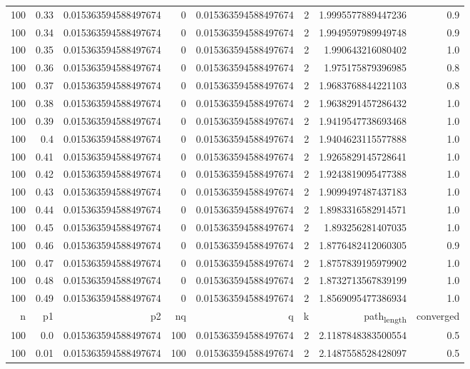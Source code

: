 \documentclass[11pt]{article}
\begin{document}
\begin{center}
\begin{tabular}{rrrrrrrr}
100 & 0.33 & 0.015363594588497674 & 0 & 0.015363594588497674 & 2 & 1.9995577889447236 & 0.9\\
100 & 0.34 & 0.015363594588497674 & 0 & 0.015363594588497674 & 2 & 1.9949597989949748 & 0.9\\
100 & 0.35 & 0.015363594588497674 & 0 & 0.015363594588497674 & 2 & 1.990643216080402 & 1.0\\
100 & 0.36 & 0.015363594588497674 & 0 & 0.015363594588497674 & 2 & 1.975175879396985 & 0.8\\
100 & 0.37 & 0.015363594588497674 & 0 & 0.015363594588497674 & 2 & 1.9683768844221103 & 0.8\\
100 & 0.38 & 0.015363594588497674 & 0 & 0.015363594588497674 & 2 & 1.9638291457286432 & 1.0\\
100 & 0.39 & 0.015363594588497674 & 0 & 0.015363594588497674 & 2 & 1.9419547738693468 & 1.0\\
100 & 0.4 & 0.015363594588497674 & 0 & 0.015363594588497674 & 2 & 1.9404623115577888 & 1.0\\
100 & 0.41 & 0.015363594588497674 & 0 & 0.015363594588497674 & 2 & 1.9265829145728641 & 1.0\\
100 & 0.42 & 0.015363594588497674 & 0 & 0.015363594588497674 & 2 & 1.9243819095477388 & 1.0\\
100 & 0.43 & 0.015363594588497674 & 0 & 0.015363594588497674 & 2 & 1.9099497487437183 & 1.0\\
100 & 0.44 & 0.015363594588497674 & 0 & 0.015363594588497674 & 2 & 1.8983316582914571 & 1.0\\
100 & 0.45 & 0.015363594588497674 & 0 & 0.015363594588497674 & 2 & 1.893256281407035 & 1.0\\
100 & 0.46 & 0.015363594588497674 & 0 & 0.015363594588497674 & 2 & 1.8776482412060305 & 0.9\\
100 & 0.47 & 0.015363594588497674 & 0 & 0.015363594588497674 & 2 & 1.8757839195979902 & 1.0\\
100 & 0.48 & 0.015363594588497674 & 0 & 0.015363594588497674 & 2 & 1.8732713567839199 & 1.0\\
100 & 0.49 & 0.015363594588497674 & 0 & 0.015363594588497674 & 2 & 1.8569095477386934 & 1.0\\
\hline
n & p1 & p2 & nq & q & k & path\textsubscript{length} & converged\\
100 & 0.0 & 0.015363594588497674 & 100 & 0.015363594588497674 & 2 & 2.1187848383500554 & 0.5\\
100 & 0.01 & 0.015363594588497674 & 100 & 0.015363594588497674 & 2 & 2.1487558528428097 & 0.5\\

\end{tabular}
\end{center}
\end{document}
